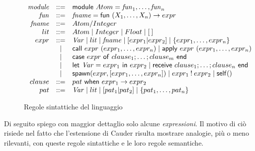 \documentclass[background.tex]{subfiles}
\begin{document}
\begin{figure}[H]
  $\displaystyle
  \begin{array}{rcl@{~~~~~~}l}
    \mathit{module} & ::= & \mathsf{module} ~ Atom = %
    \mathit{fun}_1,\ldots,\mathit{fun}_n\\
    {\mathit{fun}} & ::= & \mathit{fname} = \mathsf{fun}~(X_1,\ldots,X_n) \to expr \\
    {\mathit{fname}} & ::= & Atom/Integer \\
    lit & ::= & Atom \mid Integer \mid Float \mid \nil \\
    expr & ::= & \mathit{Var} \mid lit \mid \mathit{fname} \mid [expr_1|expr_2]
                 \mid   \{expr_1,\ldots,expr_n\} \\
    & \mid & \mathsf{call}~expr~(expr_1,\ldots,expr_n) 
    \mid \mathsf{apply}~expr~(expr_1,\ldots,expr_n) \\
    & \mid &
    \mathsf{case}~expr~\mathsf{of}~clause_1;\ldots;clause_m~\mathsf{end}\\
    & \mid & \mathsf{let}~\mathit{Var}=expr_1~\mathsf{in}~expr_2 
    \mid \mathsf{receive}~clause_1;\ldots;clause_n~\mathsf{end}\\
    & \mid & \mathsf{spawn}(expr,[expr_1,\ldots,expr_n])  
     \mid expr_1 \:!\: expr_2 \mid \mathsf{self}()\\
    clause & ::= & pat ~\mathsf{when}~expr_1 \to expr_2
    \\
    pat & ::= & \mathit{Var} \mid lit \mid [pat_1|pat_2] \mid
    \{pat_1,\ldots,pat_n\} \\
  \end{array}
  $
\caption{Regole sintattiche del linguaggio} 
\label{fig2}
\end{figure}
Di seguito spiego con maggior dettaglio solo alcune \textit{expressioni}.
Il motivo di ciò risiede nel fatto che l'estensione di Cauder risulta mostrare analogie, più o meno rilevanti, con queste regole sintattiche e le loro regole semantiche.\\
\end{document}
